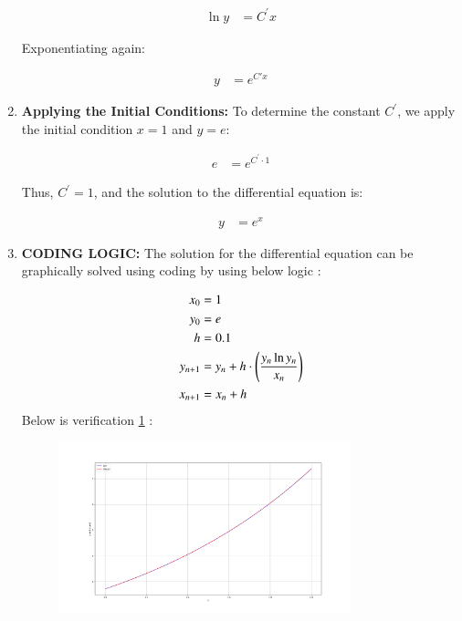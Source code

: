 \documentclass[journal]{IEEEtran}
\begin{document}
\begin{enumerate}
    \begin{align}
	    \ln{y} &= C^\prime x
    \end{align}

    Exponentiating again:

    \begin{align}
    y &= e^{C' x}
    \end{align}
    
    \item \textbf{Applying the Initial Conditions:} To determine the constant $ C^\prime $, we apply the initial condition $ x = 1 $ and $ y = e $:

    \begin{align}
    e &= e^{C^\prime \cdot 1}
    \end{align}

    Thus, $ C^\prime = 1 $, and the solution to the differential equation is:

    \begin{align}
    y &= e^x
    \end{align}

\item \textbf{CODING LOGIC:} The solution for the differential equation can be graphically solved using coding by using below logic :

\begin{align} 
	x_0 &= 1 \\ 
	y_0 &= e  \\
	h&=0.1 \\
	y_{n+1} &= y_{n} + h\cdot\left(\frac{y_{n}\ln{y_{n}}}{x_{n}}\right) \\ 
	x_{n+1} &= x_{n} + h 
\end{align}
\newpage
Below is verification \ref{fig:example} :
\begin{figure}[h]  %
    \centering  %
    \includegraphics[width=0.8\textwidth]{fig/Figure_1.png}  %
      \label{fig:example}  %
\end{figure}


\end{enumerate}
\end{document}
